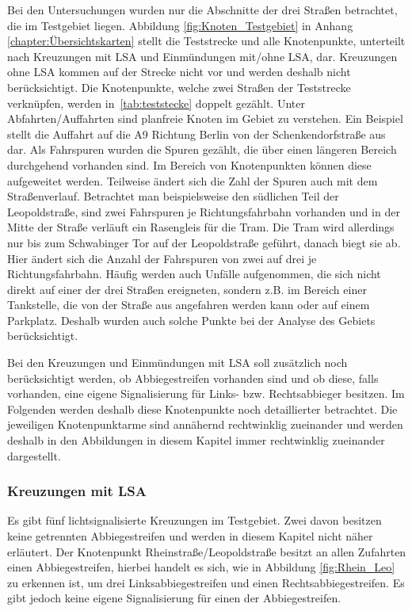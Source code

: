 Bei den Untersuchungen wurden nur die Abschnitte der drei Straßen betrachtet, die im Testgebiet liegen. Abbildung \ref{fig:Knoten_Testgebiet} in Anhang \ref{chapter:Übersichtskarten} stellt die Teststrecke und alle Knotenpunkte, unterteilt nach Kreuzungen mit LSA und Einmündungen mit/ohne LSA, dar. Kreuzungen ohne LSA kommen auf der Strecke nicht vor und werden deshalb nicht berücksichtigt. Die Knotenpunkte, welche zwei Straßen der Teststrecke verknüpfen, werden in~\autoref{tab:teststecke} doppelt gezählt. Unter Abfahrten/Auffahrten sind planfreie Knoten im Gebiet zu verstehen. Ein Beispiel stellt die Auffahrt auf die A9 Richtung Berlin von der Schenkendorfstraße aus dar. Als Fahrspuren wurden die Spuren gezählt, die über einen längeren Bereich durchgehend vorhanden sind. Im Bereich von Knotenpunkten können diese aufgeweitet werden. Teilweise ändert sich die Zahl der Spuren auch mit dem Straßenverlauf. Betrachtet man beispielsweise den südlichen Teil der Leopoldstraße, sind zwei Fahrspuren je Richtungsfahrbahn vorhanden und in der Mitte der Straße verläuft ein Rasengleis für die Tram. Die Tram wird allerdings nur bis zum Schwabinger Tor auf der Leopoldstraße geführt, danach biegt sie ab. Hier ändert sich die Anzahl der Fahrspuren von zwei auf drei je Richtungsfahrbahn. Häufig werden auch Unfälle aufgenommen, die sich nicht direkt auf einer der drei Straßen ereigneten, sondern z.B. im Bereich einer Tankstelle, die von der Straße aus angefahren werden kann oder auf einem Parkplatz. Deshalb wurden auch solche Punkte bei der Analyse des Gebiets berücksichtigt.

Bei den Kreuzungen und Einmündungen mit LSA soll zusätzlich noch berücksichtigt werden, ob Abbiegestreifen vorhanden sind und ob diese, falls vorhanden, eine eigene Signalisierung für Links- bzw. Rechtsabbieger besitzen. Im Folgenden werden deshalb diese Knotenpunkte noch detaillierter betrachtet. Die jeweiligen Knotenpunktarme sind annähernd rechtwinklig zueinander und werden deshalb in den Abbildungen in diesem Kapitel immer rechtwinklig zueinander dargestellt.

\subsubsection{Kreuzungen mit LSA}
Es gibt fünf lichtsignalisierte Kreuzungen im Testgebiet. Zwei davon besitzen keine getrennten Abbiegestreifen und werden in diesem Kapitel nicht näher erläutert. Der Knotenpunkt Rheinstraße/Leopoldstraße besitzt an allen Zufahrten einen Abbiegestreifen, hierbei handelt es sich, wie in Abbildung \ref{fig:Rhein_Leo} zu erkennen ist, um drei Linksabbiegestreifen und einen Rechtsabbiegestreifen. Es gibt jedoch keine eigene Signalisierung für einen der Abbiegestreifen. 

